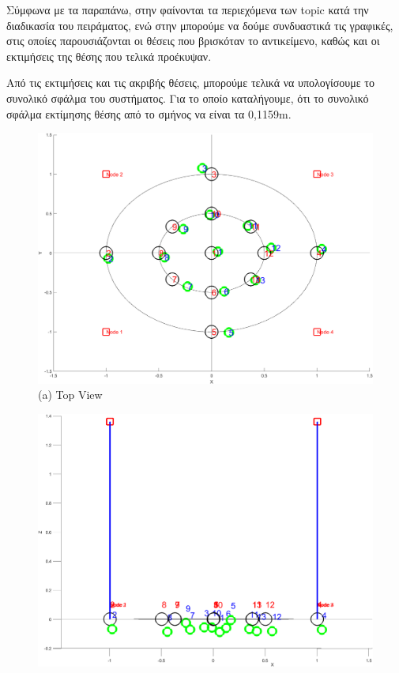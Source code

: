 Σύμφωνα με τα παραπάνω, στην  φαίνονται τα περιεχόμενα των topic κατά την διαδικασία του πειράματος, ενώ στην  μπορούμε να δούμε συνδυαστικά τις γραφικές, στις οποίες παρουσιάζονται οι θέσεις που βρισκόταν το αντικείμενο, καθώς και οι εκτιμήσεις της θέσης που τελικά προέκυψαν.

Από τις εκτιμήσεις και τις ακριβής θέσεις, μπορούμε τελικά να υπολογίσουμε το συνολικό σφάλμα του συστήματος. Για το οποίο καταλήγουμε, ότι το συνολικό σφάλμα εκτίμησης θέσης από το σμήνος να είναι τα 0,1159m.

\begin{figure} [H]
	\centering
    \begin{minipage}{.5\textwidth}
      \centering
      \includegraphics[width=0.9\linewidth]{../Images/Experiments-Results/nodes-pos-with-est-up.png}\\
      {(a) Top View}
    \end{minipage}%
    \begin{minipage}{.5\textwidth}
      \centering
      \includegraphics[width=.9\linewidth]{../Images/Experiments-Results/nodes-pos-with-est-side.png}\\

\end{minipage}
\end{figure}
